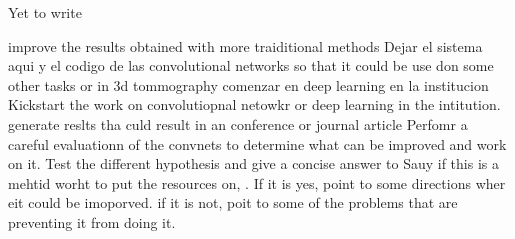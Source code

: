 Yet to write

improve the results obtained with more traiditional methods
Dejar el sistema aqui y el codigo de las convolutional networks so that it could be use don some other tasks or in 3d tommography 
comenzar en deep learning en la institucion Kickstart the work on convolutiopnal netowkr or deep learning in the intitution. 
generate reslts tha culd result in an conference or journal article
Perfomr a careful evaluationn of the convnets to determine what can be improved and work on it. 
Test the different hypothesis and give a concise answer to 
Sauy if this is a mehtid worht to put the resources on, . If it is yes, point to some directions wher eit could be imoporved. if it  is not, poit to some of the problems that are preventing it from doing it. 




\begin{comment}
Especificar en esta sección qué es lo que quiere lograr con respecto al problema identificado
en forma general y particular. Puede incluir alcances y cualquier otro
elemento que considere pertinente para delimitar su trabajo. 


{\bf Por ejemplo:}

El objetivo general de este trabajo.......

Los objetivos particulares a cumplir en este trabajo de investigación son los
siguientes: 
\begin{itemize}
	\item El primer objetivo...
	\item El segundo objetivo...
\end{itemize}

Esta sección puede contener también el {\it Modelo Particular}, que es el modelo de solución propuesto para el
problema y que obviamente debe ser consistente con los objetivos
establecidos. Se le llama {\it Modelo Particular}
 porque es en el cual se guía
el trabajo de investigación y que desemboca en lo que es la
 {\bf CONTRIBUCIÓN PERSONAL}.
Aquí es donde los aspectos de creatividad e innovación deben verse aplicados a nuestro
trabajo.
\end{comment}
